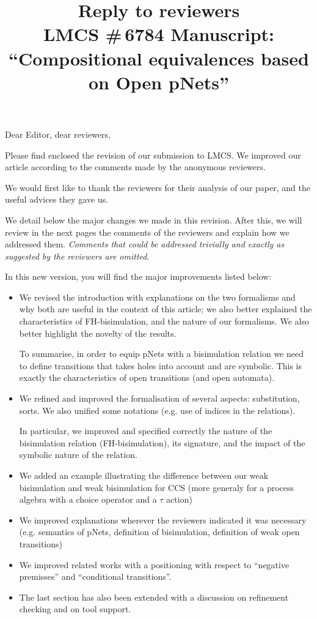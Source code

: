 \documentclass{article}
\title{Reply to reviewers\\
LMCS \#\,6784 Manuscript: \\``Compositional equivalences based on Open pNets'' }
\begin{document}
\maketitle
\noindent
Dear Editor, dear reviewers,

Please find enclosed the revision of our submission to LMCS. We improved our article according to the comments made by the
anonymous reviewers.

We would first like to thank the reviewers for their analysis of our
paper, and the useful advices they gave us.

We detail below the major changes we made in this revision. After
this, we will review in the next pages the comments of the reviewers
and explain how we addressed them.  \emph{Comments that could be
  addressed trivially and exactly as suggested by the reviewers are
  omitted}.  \medskip

In this new version, you will find the major improvements listed below:
\begin{itemize}
\item We revised the introduction with explanations on the two formalisms and why both are useful in the context of this article; we also better explained the characteristics of FH-bisimulation, and the nature of our formalisms. We also better highlight the novelty of the results.

To summarise, in order to equip  pNets with a bisimulation relation we need to define transitions that takes holes into account and are symbolic. This is exactly the characteristics of open transitions (and open automata).
\item We refined and improved the formalisation of several aspects: substitution, sorts. We also unified some notations (e.g. use of indices in the relations).

 In particular, we improved and specified correctly the nature of the bisimulation relation (FH-bisimulation), its signature, and the impact of the symbolic nature of the relation.

\item We added an example illustrating the difference between our weak bisimulation and weak bisimulation for CCS (more generaly for a process algebra with a choice operator and a $\tau$ action)

\item We improved explanations wherever the reviewers indicated it was necessary (e.g.  semantics of pNets,  definition of bisimulation, definition of weak open transitions)

\item We improved related works with a positioning with respect to ``negative premisses'' and ``conditional transitions''.

\item The last section has also been extended with a discussion on refinement checking and on tool support.
\end{itemize}
\end{document}
